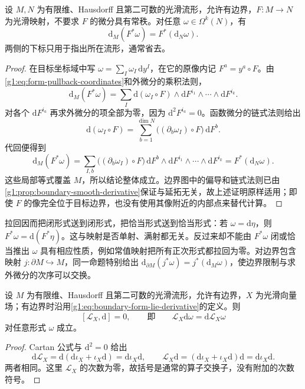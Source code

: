\begin{proposition}\label{g1:prop:exterior-pullback}
	设 \(M,N\) 为有限维、Hausdorff 且第二可数的光滑流形，允许有边界，\(F:M\to N\) 为光滑映射，不要求 \(F\) 的微分具有常秩。对任意 \(\omega\in\Omega^k(N)\)，有
	\[
		\mathrm{d}_M(F^*\omega)=F^*(\mathrm{d}_N\omega).
	\]
	两侧的下标只用于指出所在流形，通常省去。
\end{proposition}
\begin{proof}
	在目标坐标域中写 \(\omega=\sum_I\omega_I\,\mathrm{d}y^I\)，在它的原像内记 \(F^a=y^a\circ F\)。由\eqref{g1:eq:form-pullback-coordinates}和外微分的乘积法则，
	\[
		\mathrm{d}_M(F^*\omega)
		=\sum_I\mathrm{d}(\omega_I\circ F)\wedge\mathrm{d}F^{i_1}\wedge\cdots\wedge\mathrm{d}F^{i_k}.
	\]
	对各个 \(\mathrm{d}F^{i_a}\) 再求外微分的项全部为零，因为 \(\mathrm{d}^2F^{i_a}=0\)。函数微分的链式法则给出
	\[
		\mathrm{d}(\omega_I\circ F)=\sum_{b=1}^{\dim N}\bigl((\partial_b\omega_I)\circ F\bigr)\,\mathrm{d}F^b.
	\]
	代回便得到
	\[
		\mathrm{d}_M(F^*\omega)
		=\sum_{I,b}\bigl((\partial_b\omega_I)\circ F\bigr)\,\mathrm{d}F^b\wedge\mathrm{d}F^{i_1}\wedge\cdots\wedge\mathrm{d}F^{i_k}
		=F^*(\mathrm{d}_N\omega).
	\]
	这些局部等式覆盖 \(M\)，所以结论整体成立。边界图中的偏导和链式法则已由\cref{g1:prop:boundary-smooth-derivative}保证与延拓无关，故上述证明原样适用；即使 \(F\) 的像完全位于目标边界，也没有使用其像附近的内部点来替代计算。
\end{proof}

拉回因而把闭形式送到闭形式，把恰当形式送到恰当形式：若 \(\omega=\mathrm{d}\eta\)，则 \(F^*\omega=\mathrm{d}(F^*\eta)\)。这与映射是否单射、满射都无关。反过来却不能由 \(F^*\omega\) 闭或恰当推出 \(\omega\) 具有相应性质，例如常值映射把所有正次形式都拉回为零。对边界包含映射 \(j:\partial M\hookrightarrow M\)，同一命题特别给出 \(\mathrm{d}_{\partial M}(j^*\omega)=j^*(\mathrm{d}_M\omega)\)，使边界限制与求外微分的次序可以交换。

\begin{proposition}\label{g1:prop:exterior-lie-commute}
	设 \(M\) 为有限维、Hausdorff 且第二可数的光滑流形，允许有边界，\(X\) 为光滑向量场；有边界时沿用\eqref{g1:eq:boundary-form-lie-derivative}的定义。则
	\[
		[\mathcal L_X,\mathrm{d}]=0,
		\qquad\text{即}\qquad \mathcal L_X\mathrm{d}\omega=\mathrm{d}\mathcal L_X\omega
	\]
	对任意形式 \(\omega\) 成立。
\end{proposition}
\begin{proof}
	Cartan 公式与 \(\mathrm{d}^2=0\) 给出
	\[
		\mathrm{d}\mathcal L_X
		=\mathrm{d}(\mathrm{d}\iota_X+\iota_X\mathrm{d})
		=\mathrm{d}\iota_X\mathrm{d},\qquad
		\mathcal L_X\mathrm{d}
		=(\mathrm{d}\iota_X+\iota_X\mathrm{d})\mathrm{d}
		=\mathrm{d}\iota_X\mathrm{d}.
	\]
	两者相同。这里 \(\mathcal L_X\) 的次数为零，故括号是通常的算子交换子，没有附加的次数符号。
\end{proof}

